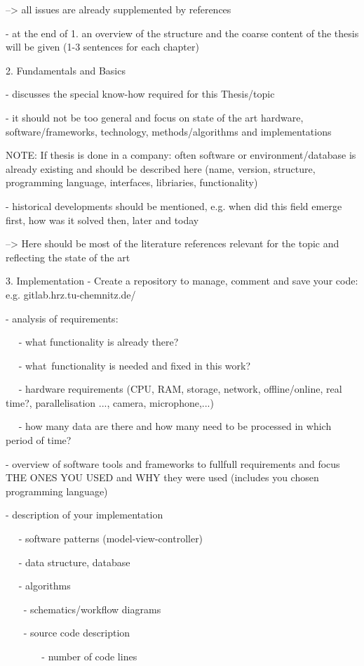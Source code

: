 --> all issues are already supplemented by references

- at the end of 1. an overview of the structure and the coarse content of the thesis will be given (1-3 sentences for each chapter)




2. Fundamentals and Basics

- discusses the special know-how required for this Thesis/topic

- it should not be too general and focus on state of the art hardware, software/frameworks, technology, methods/algorithms and implementations

NOTE: If thesis is done in a company: often software or environment/database is already existing and should be described here (name, version, structure, programming language, interfaces, libriaries, functionality)

- historical developments should be mentioned, e.g. when did this field emerge first, how was it solved then, later and today

--> Here should be most of the literature references relevant for the topic and reflecting the state of the art

3. Implementation
- Create a repository to manage, comment and save your code: e.g. gitlab.hrz.tu-chemnitz.de/

- analysis of requirements:

   - what functionality is already there?

   - what functionality is needed and fixed in this work?

   - hardware requirements (CPU, RAM, storage, network, offline/online, real time?, parallelisation ..., camera, microphone,...)

   - how many data are there and how many need to be processed in which period of time?

- overview of software tools and frameworks to fullfull requirements and focus THE ONES YOU USED and WHY they were used (includes you chosen programming language)

- description of your implementation

   - software patterns (model-view-controller)

   - data structure, database

   - algorithms

    - schematics/workflow diagrams

    - source code description

        - number of code lines

